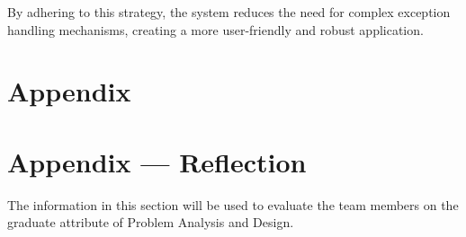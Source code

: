 \documentclass[12pt, titlepage]{article}
\begin{document}
By adhering to this strategy, the system reduces the need for complex exception handling mechanisms, creating a more user-friendly and robust application.



\newpage{}

\section{Appendix} \label{Appendix}


\newpage{}

\section*{Appendix --- Reflection}


The information in this section will be used to evaluate the team members on the
graduate attribute of Problem Analysis and Design.

%
\end{document}
